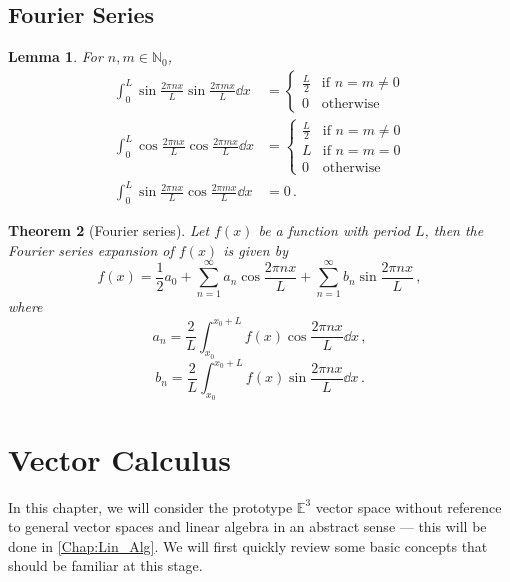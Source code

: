 \documentclass{article}
\theoremstyle{plain}\theoremheaderfont{\normalfont\itshape}\theorembodyfont{\rmfamily}\theoremseparator{.}\newtheorem*{rem}{Remark}\newtheorem*{ex}{Example}\newtheorem*{proof}{Proof}\newtheorem*{altp}{Alternative proof}
\theoremstyle{plain}\theoremheaderfont{\normalfont\bfseries}\theorembodyfont{\rmfamily}\theoremseparator{.}\newtheorem{thm}{Theorem}[section]\newtheorem{lem}[thm]{Lemma}\newtheorem{prop}[thm]{Proposition}\newtheorem*{cor}{Corollary}\newtheorem{defn}[thm]{Definition}\newtheorem{clm}[thm]{Claim}\newtheorem{clminproof}{Claim}
\theoremstyle{break}\theoremheaderfont{\normalfont\itshape}\theorembodyfont{\rmfamily}\theoremseparator{.\medskip}\newtheorem*{proofskip}{Proof}\newtheorem*{exs}{Examples}\newtheorem*{rems}{Remarks}
\theoremstyle{break}\theoremheaderfont{\normalfont\bfseries}\theorembodyfont{\rmfamily}\theoremseparator{.\medskip}\newtheorem{lemskip}[thm]{Lemma}\newtheorem{defnskip}[thm]{Definition}\newtheorem{propskip}[thm]{Proposition}\newtheorem{thmskip}[thm]{Theorem}
\numberwithin{equation}{section}
\begin{document}
	\subsection{Fourier Series}
	\begin{lem}
		For \(n,m\in\mathbb{N}_0\),
		\begin{align*}
			\int_{0}^{L}\sin\frac{2\pi nx}{L}\sin\frac{2\pi mx}{L}\dd{x}&=\begin{cases}
				\frac{L}{2} & \text{if }n=m\ne 0\\
				0 & \text{otherwise}
			\end{cases} \\
			\int_{0}^{L}\cos\frac{2\pi nx}{L}\cos\frac{2\pi mx}{L}\dd{x}&=\begin{cases}
				\frac{L}{2} & \text{if }n=m\ne 0\\
				L & \text{if }n=m=0 \\
				0 & \text{otherwise}
			\end{cases} \\
			\int_{0}^{L}\sin\frac{2\pi nx}{L}\cos\frac{2\pi mx}{L}\dd{x}&=0\,.
		\end{align*}
	\end{lem}
	\begin{thm}[Fourier series]
		Let \(f(x)\) be a function with period \(L\), then the
		Fourier series expansion of \(f(x)\) is given by
		\[f(x)=\frac{1}{2}a_0+\sum_{n=1}^{\infty}a_n\cos\frac{2\pi nx}{L}+\sum_{n=1}^{\infty}b_n\sin\frac{2\pi nx}{L}\,,\]
		where
		\[a_n=\frac{2}{L}\int_{x_0}^{x_0+L}f(x)\cos\frac{2\pi nx}{L}\dd{x}\,,\]
		\[b_n=\frac{2}{L}\int_{x_0}^{x_0+L}f(x)\sin\frac{2\pi nx}{L}\dd{x}\,.\]
	\end{thm}
	\newpage
	\section{Vector Calculus}
	In this chapter, we will consider the prototype \(\mathbb{E}^3\) vector space without reference to general vector spaces and linear algebra in an abstract sense --- this will be done in \cref{Chap:Lin_Alg}. We will first quickly review some basic concepts that should be familiar at this stage.
\end{document}
